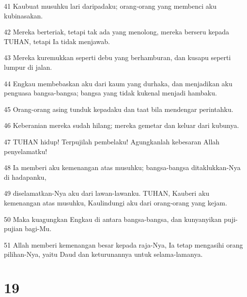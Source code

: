 \par 41 Kaubuat musuhku lari daripadaku; orang-orang yang membenci aku kubinasakan.
\par 42 Mereka berteriak, tetapi tak ada yang menolong, mereka berseru kepada TUHAN, tetapi Ia tidak menjawab.
\par 43 Mereka kuremukkan seperti debu yang berhamburan, dan kusapu seperti lumpur di jalan.
\par 44 Engkau membebaskan aku dari kaum yang durhaka, dan menjadikan aku penguasa bangsa-bangsa; bangsa yang tidak kukenal menjadi hambaku.
\par 45 Orang-orang asing tunduk kepadaku dan taat bila mendengar perintahku.
\par 46 Keberanian mereka sudah hilang; mereka gemetar dan keluar dari kubunya.
\par 47 TUHAN hidup! Terpujilah pembelaku! Agungkanlah kebesaran Allah penyelamatku!
\par 48 Ia memberi aku kemenangan atas musuhku; bangsa-bangsa ditaklukkan-Nya di hadapanku,
\par 49 diselamatkan-Nya aku dari lawan-lawanku. TUHAN, Kauberi aku kemenangan atas musuhku, Kaulindungi aku dari orang-orang yang kejam.
\par 50 Maka kuagungkan Engkau di antara bangsa-bangsa, dan kunyanyikan puji-pujian bagi-Mu.
\par 51 Allah memberi kemenangan besar kepada raja-Nya, Ia tetap mengasihi orang pilihan-Nya, yaitu Daud dan keturunannya untuk selama-lamanya.

\chapter{19}


